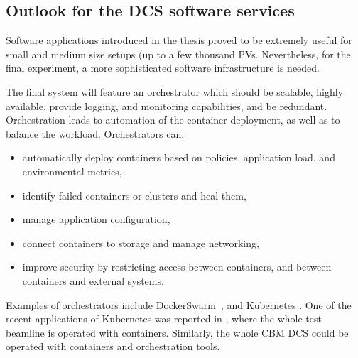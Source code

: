 \subsection{Outlook for the DCS software services} 
Software applications introduced in the thesis proved to be extremely useful for small and medium size setups (up to a few thousand \glspl{PV}. Nevertheless, for the final experiment, a more sophisticated software infrastructure is needed.

The final system will feature an orchestrator which should be scalable, highly available, provide logging, and monitoring capabilities, and be redundant. Orchestration leads to automation of the container deployment, as well as to balance the workload. Orchestrators can:
 \begin{itemize}
     \item automatically deploy containers based on policies, application load, and environmental metrics,
     \item identify failed containers or clusters and heal them,
     \item manage application configuration,
     \item connect containers to storage and manage networking,
     \item improve security by restricting access between containers, and between containers and external systems.
 \end{itemize}

 Examples of orchestrators include DockerSwarm~\cite{DockerSwarm}, and Kubernetes \cite{Kubernetes}. One of the recent applications of Kubernetes was reported in \cite{ICALEPCS2021:Diamond}, where the whole test beamline is operated with containers. Similarly, the whole \gls{CBM} \gls{DCS} could be operated with containers and orchestration tools. 


